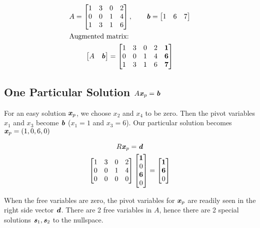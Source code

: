 \documentclass[12pt, letterpaper]{article}
\newcommand{\V}[1]{\textbf{\textit{#1}}}
\begin{document}
		\begin{gather*}
			A = \begin{bmatrix}
			1&3&0&2\\
			0&0&1&4\\
			1&3&1&6
			\end{bmatrix}, \qquad \V{b} = \begin{bmatrix} 1 & 6 & 7 \end{bmatrix} \\
		\intertext{Augmented matrix:}
			\begin{bmatrix} A & \V{b}\end{bmatrix} = \begin{bmatrix}
														1&3&0&2 & \textbf{1}\\
														0&0&1&4 & \textbf{6}\\
														1&3&1&6 & \textbf{7}
													\end{bmatrix}
		\end{gather*}
	
	
\subsection{One Particular Solution $A\V{x}_p = \V{b}$}
	For an easy solution $\V{x}_p$, we choose $x_2$ and $x_4$ to be zero. Then the pivot variables $x_1$ and $x_3$ become $\V{b}$ ($x_1=1$ and $x_3=6$). Our particular solution becomes $\V{x}_p = (1,0,6,0)$
	
		\begin{gather*}
			R\V{x}_p = \V{d} \\
			\begin{bmatrix}
					1&3&0&2\\
					0&0&1&4\\
					0&0&0&0
				\end{bmatrix} \begin{bmatrix}\textbf{1} \\
											  0 \\
											  \textbf{6} \\
											  0 \end{bmatrix} = \begin{bmatrix}
											  						\textbf{1} \\ \textbf{6} \\ 0
											  					\end{bmatrix}
		\end{gather*} 
	
	
	When the free variables are zero, the pivot variables for $\V{x}_p$ are readily seen in the right side vector $\V{d}$. There are 2 free variables in $A$, hence there are 2 special solutions $\V{s}_1, \V{s}_2$ to the nullspace.
	
\end{document}
